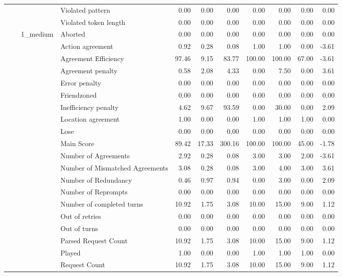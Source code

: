 \begin{tabular}{llllrrrrrrr}
 &  &  & Violated pattern & 0.00 & 0.00 & 0.00 & 0.00 & 0.00 & 0.00 & 0.00 \\
 &  &  & Violated token length & 0.00 & 0.00 & 0.00 & 0.00 & 0.00 & 0.00 & 0.00 \\
\cline{3-11}
 &  & \multirow[t]{27}{*}{1_medium} & Aborted & 0.00 & 0.00 & 0.00 & 0.00 & 0.00 & 0.00 & 0.00 \\
 &  &  & Action agreement & 0.92 & 0.28 & 0.08 & 1.00 & 1.00 & 0.00 & -3.61 \\
 &  &  & Agreement Efficiency & 97.46 & 9.15 & 83.77 & 100.00 & 100.00 & 67.00 & -3.61 \\
 &  &  & Agreement penalty & 0.58 & 2.08 & 4.33 & 0.00 & 7.50 & 0.00 & 3.61 \\
 &  &  & Error penalty & 0.00 & 0.00 & 0.00 & 0.00 & 0.00 & 0.00 & 0.00 \\
 &  &  & Friendzoned & 0.00 & 0.00 & 0.00 & 0.00 & 0.00 & 0.00 & 0.00 \\
 &  &  & Inefficiency penalty & 4.62 & 9.67 & 93.59 & 0.00 & 30.00 & 0.00 & 2.09 \\
 &  &  & Location agreement & 1.00 & 0.00 & 0.00 & 1.00 & 1.00 & 1.00 & 0.00 \\
 &  &  & Lose & 0.00 & 0.00 & 0.00 & 0.00 & 0.00 & 0.00 & 0.00 \\
 &  &  & Main Score & 89.42 & 17.33 & 300.16 & 100.00 & 100.00 & 45.00 & -1.78 \\
 &  &  & Number of Agreements & 2.92 & 0.28 & 0.08 & 3.00 & 3.00 & 2.00 & -3.61 \\
 &  &  & Number of Mismatched Agreements & 3.08 & 0.28 & 0.08 & 3.00 & 4.00 & 3.00 & 3.61 \\
 &  &  & Number of Redundancy & 0.46 & 0.97 & 0.94 & 0.00 & 3.00 & 0.00 & 2.09 \\
 &  &  & Number of Reprompts & 0.00 & 0.00 & 0.00 & 0.00 & 0.00 & 0.00 & 0.00 \\
 &  &  & Number of completed turns & 10.92 & 1.75 & 3.08 & 10.00 & 15.00 & 9.00 & 1.12 \\
 &  &  & Out of retries & 0.00 & 0.00 & 0.00 & 0.00 & 0.00 & 0.00 & 0.00 \\
 &  &  & Out of turns & 0.00 & 0.00 & 0.00 & 0.00 & 0.00 & 0.00 & 0.00 \\
 &  &  & Parsed Request Count & 10.92 & 1.75 & 3.08 & 10.00 & 15.00 & 9.00 & 1.12 \\
 &  &  & Played & 1.00 & 0.00 & 0.00 & 1.00 & 1.00 & 1.00 & 0.00 \\
 &  &  & Request Count & 10.92 & 1.75 & 3.08 & 10.00 & 15.00 & 9.00 & 1.12 \\

\end{tabular}
